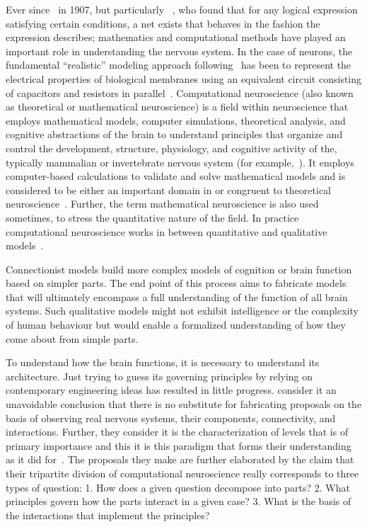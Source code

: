 \documentclass[11pt,3p,twocolumn]{JMN}
\begin{document}
Ever since~\citet{lapicque07} in 1907, but particularly ~\citet{mcculloch43}, who found that for any logical expression satisfying certain conditions, a net exists that behaves in the fashion the expression describes; mathematics and computational methods have played an important role in understanding the nervous system. In the case of neurons, the fundamental ``realistic'' modeling approach following~\citet{hodgkin52e} has been to represent the electrical properties of biological membranes using an equivalent circuit consisting of capacitors and resistors in parallel~\citep[more recently, see][]{bedard13}. Computational neuroscience (also known as theoretical or mathematical neuroscience) is a field within neuroscience that employs mathematical models, computer simulations, theoretical analysis, and cognitive abstractions of the brain to understand principles that organize and control the development, structure, physiology, and cognitive activity of the, typically mammalian or invertebrate nervous system (for example,~\citealt[][]{L:1992kl,ejn17}). It employs computer-based calculations to validate and solve mathematical models and is considered to be either an important domain in or congruent to theoretical neuroscience~\citep{trappenberg23}. Further, the term mathematical neuroscience is also used sometimes, to stress the quantitative nature of the field. In practice computational neuroscience works in between quantitative and qualitative models~\citep{sandberg08}.

Connectionist models build more complex models of cognition or brain function based on simpler parts. The end point of this process aims to fabricate models that will ultimately encompass a full understanding of the function of all brain systems. Such qualitative models might not exhibit intelligence or the complexity of human behaviour but would enable a formalized understanding of how they come about from simple parts.

To understand how the brain functions, it is necessary to understand its architecture. Just trying to guess its governing principles by relying on contemporary engineering ideas has resulted in little progress. \citet*{Churchland:1992uq} consider it an unavoidable conclusion that there is no substitute for fabricating proposals on the basis of observing real nervous systems, their components, connectivity, and interactions. Further, they consider it is the characterization of levels that is of primary importance and this it is this paradigm that forms their understanding as it did for~\citet{Marr:1982fk}. The proposals they make are further elaborated by the claim that their tripartite division of computational neuroscience really corresponds to three types of question: 1. How does a given question decompose into parts? 2. What principles govern how the parts interact in a given case? 3. What is the basis of the interactions that implement the principles?
\end{document}
